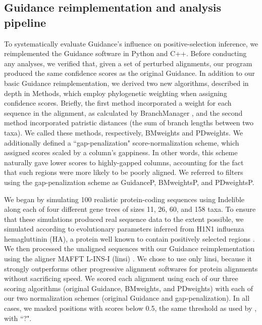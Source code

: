 \documentclass[10pt]{article}
\begin{document}
\subsection*{Guidance reimplementation and analysis pipeline}
To systematically evaluate Guidance's influence on positive-selection inference, we reimplemented the Guidance software in Python and C++. Before conducting any analyses, we verified that, given a set of perturbed alignments, our program produced the same confidence scores as the original Guidance. In addition to our basic Guidance reimplementation, we derived two new algorithms, described in depth in Methods, which employ phylogenetic weighting when assigning confidence scores. Briefly, the first method incorporated a weight for each sequence in the alignment, as calculated by BranchManager \citep{Stone2007}, and the second method incorporated patristic distances (the sum of branch lengths between two taxa). We called these methods, respectively, BMweights and PDweights.  We additionally defined a ``gap-penalization" score-normalization scheme, which assigned scores scaled by a column's gappiness. In other words, this scheme naturally gave lower scores to highly-gapped columns, accounting for the fact that such regions were more likely to be poorly aligned. We referred to filters using the gap-penalization scheme as GuidanceP, BMweightsP, and PDweightsP.

We began by simulating 100 realistic protein-coding sequences using Indelible \citep{Fletcher2009} along each of four different gene trees of sizes 11, 26, 60, and 158 taxa. To ensure that these simulations produced real sequence data to the extent possible, we simulated according to evolutionary parameters inferred from H1N1 influenza hemagluttinin (HA), a protein well known to contain positively selected regions \citep{Bush1999, Kryazhimskiy2008, Meyer2012}. We then processed the unaligned sequences with our Guidance reimplementation using the aligner MAFFT L-INS-I (linsi) \citep{Katoh2005}. We chose to use only linsi, because it strongly outperforms other progressive alignment softwares for protein alignments \citep{Thompson2011,Nuin2006} without sacrificing speed. We scored each alignment using each of our three scoring algorithms (original Guidance, BMweights, and PDweights) with each of our two normalization schemes (original Guidance and gap-penalization). In all cases, we masked positions with scores below 0.5, the same threshold as used by \citet{Jordan2012}, with ``?".
\end{document}
